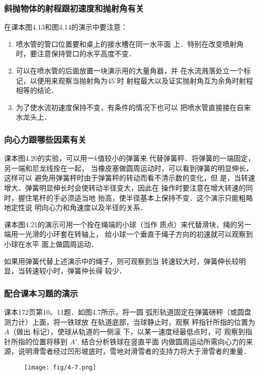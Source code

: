 \subsubsection{斜抛物体的射程跟初速度和抛射角有关}
在课本图4.13和图4.14的演示中要注意：
\begin{enumerate}
\item 喷水管的管口位置要和桌上的接水槽在同一水平面
上．特别在改变喷射角时，要注意保持管口的水平高度不变．
\item 可以在喷水管的后面放置一块演示用的大量角器，并
在水流溅落处立一个标记，以便用来观察当抛射角为$45^{\circ}$时
射程最大以及证实抛射角互为余角时射程相等的结论．
\item 为了使水流初速度保持不变，有条件的情况下也可以
把喷水管直接接在自来水龙头上．
\end{enumerate}



\subsubsection{向心力跟哪些因素有关}
课本图4.20的实验，可以用一$k$值较小的弹簧来
代替弹簧秤．将弹簧的一端固定，另一端和尼龙线拴在一起，
当橡皮塞做圆周运动时，可以看到弹簧的明显伸长，这样可以
避免用弹簧秤时由于弹簧秤的转动而看不清示数的变化，但
是，当转速增大、弹簧明显伸长时会使转动半径变大，因此在
操作时要注意在增大转速的同时，握住笔杆的手必须适当地
抬高，使半径基本上保持不变．这个演示只能粗略地定性说
明向心力和角速度以及半径的关系．

课本图4.21的演示可用一个拴在绳端的小球（当作
质点）来代替滑块，绳的另一端用一光滑的小环套在转轴上，
给小球一个垂直于绳子方向的初速就可以观察到小球在水平
面上做圆周运动．

如果用弹簧代替上述演示中的绳子，则可观察到当
转速较大时，弹簧伸长较明显，当转速较小时，弹簧仲长得
较少．

\subsubsection{配合课本习题的演示}
课本172页第10、11题．如图4.7所示，将一圆
弧形轨道固定在弹簧磅秤（或圆盘测力计）上面，将一铁球放
在轨道底部，当球静止时，观察
秤指针所指的位置为$A$（做出
标记），使球从轨道的一侧滚
下，以某一速度经最低点时，可
观察到指针所指的位置将移到
$A'$. 结合分析铁球在竖直平面
内做圆周运动所需向心力的来
源，说明滑雪者经过凹形坡底时，雪地对滑雪者的支持力将大于滑雪者的重量．

\begin{figure}[htp]
    \centering
    \texttt{[image: fig/4-7.png]}
    \caption{}
\end{figure}

